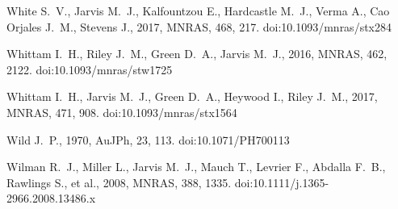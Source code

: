 \documentclass[usenatbib,usedcolumn]{mnras}
\begin{document}
\begin{thebibliography}{}
 White S.~V., Jarvis M.~J., Kalfountzou E., Hardcastle M.~J., Verma A., Cao Orjales J.~M., Stevens J., 2017, MNRAS, 468, 217. doi:10.1093/mnras/stx284

 Whittam I.~H., Riley J.~M., Green D.~A., Jarvis M.~J., 2016, MNRAS, 462, 2122. doi:10.1093/mnras/stw1725

 Whittam I.~H., Jarvis M.~J., Green D.~A., Heywood I., Riley J.~M., 2017, MNRAS, 471, 908. doi:10.1093/mnras/stx1564

 Wild J.~P., 1970, AuJPh, 23, 113. doi:10.1071/PH700113

 Wilman R.~J., Miller L., Jarvis M.~J., Mauch T., Levrier F., Abdalla F.~B., Rawlings S., et al., 2008, MNRAS, 388, 1335. doi:10.1111/j.1365-2966.2008.13486.x

\end{thebibliography}
\end{document}

